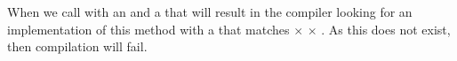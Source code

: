 \inputminted{csharp}{\context/answer/Adder.cs}

When we call  with an  and a  that will result in the compiler looking for an implementation of this method with a  that matches  $\times$  $\times$ . As this does not exist, then compilation will fail.
